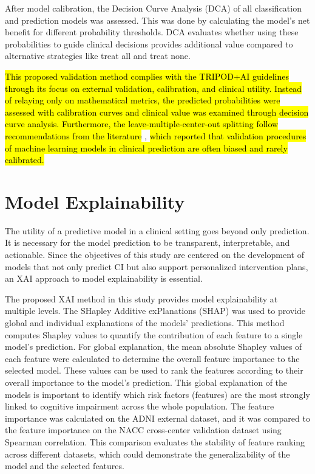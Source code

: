 After model calibration, the Decision Curve Analysis (\acrshort{DCA}) of all classification and prediction models was assessed. This was done by calculating the model’s net benefit for different probability thresholds. DCA evaluates whether using these probabilities to guide clinical decisions provides additional value compared to alternative strategies like treat all and treat none.

\hl{This proposed validation method complies with the TRIPOD+AI guidelines} \cite{Collins2024TRIPOD+AI} \hl{through its focus on external validation, calibration, and clinical utility. Instead of relaying only on mathematical metrics, the predicted probabilities were assessed with calibration curves and clinical value was examined through decision curve analysis. Furthermore, the leave-multiple-center-out splitting follow recommendations from the literature} \cite{Christodoulou2019systematic}, \hl{which reported that validation procedures of machine learning models in clinical prediction are often biased and rarely calibrated.}

\section{Model Explainability}
The utility of a predictive model in a clinical setting goes beyond only prediction. It is necessary for the model prediction to be transparent, interpretable, and actionable. Since the objectives of this study are centered on the development of models that not only predict CI but also support personalized intervention plans, an XAI approach to model explainability is essential. 

The proposed XAI method in this study provides model explainability at multiple levels. The SHapley Additive exPlanations (\acrshort{SHAP}) \cite{Lundberg2017Unified} was used to provide global and individual explanations of the models’ predictions. This method computes Shapley values to quantify the contribution of each feature to a single model's prediction. For global explanation, the mean absolute Shapley values of each feature were calculated to determine the overall feature importance to the selected model. These values can be used to rank the features according to their overall importance to the model's prediction. This global explanation of the models is important to identify which risk factors (features) are the most strongly linked to cognitive impairment across the whole population. The feature importance was calculated on the ADNI external dataset, and it was compared to the feature importance on the NACC cross-center validation dataset using Spearman correlation. This comparison evaluates the stability of feature ranking across different datasets, which could demonstrate the generalizability of the model and the selected features.

